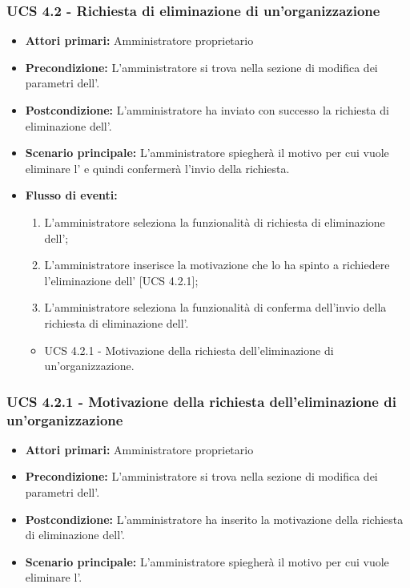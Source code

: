 \subsubsection{UCS 4.2 - Richiesta di eliminazione di un'organizzazione}%
\begin{itemize}
\item \textbf{Attori primari:} Amministratore proprietario
\item \textbf{Precondizione:} L'amministratore si trova nella sezione di modifica dei parametri dell'.
\item \textbf{Postcondizione:} L'amministratore ha inviato con successo la richiesta di eliminazione dell'.
\item \textbf{Scenario principale:} L'amministratore spiegherà il motivo per cui vuole eliminare l' e quindi confermerà l'invio della richiesta.
\item \textbf{Flusso di eventi:}
\begin{enumerate}
    \item L'amministratore seleziona la funzionalità di richiesta di eliminazione dell';
    \item L'amministratore inserisce la motivazione che lo ha spinto a richiedere l'eliminazione dell' [UCS 4.2.1];
    \item L'amministratore seleziona la funzionalità di conferma dell'invio della richiesta di eliminazione dell'.
\end{enumerate}
\begin{itemize}
    \item UCS 4.2.1 - Motivazione della richiesta dell'eliminazione di un'organizzazione.
\end{itemize}
\end{itemize}

\subsubsection{UCS 4.2.1 - Motivazione della richiesta dell'eliminazione di un'organizzazione}%
\begin{itemize}
\item \textbf{Attori primari:} Amministratore proprietario
\item \textbf{Precondizione:} L'amministratore si trova nella sezione di modifica dei parametri dell'.
\item \textbf{Postcondizione:} L'amministratore ha inserito la motivazione della richiesta di eliminazione dell'.
\item \textbf{Scenario principale:} L'amministratore spiegherà il motivo per cui vuole eliminare l'.
\end{itemize}

